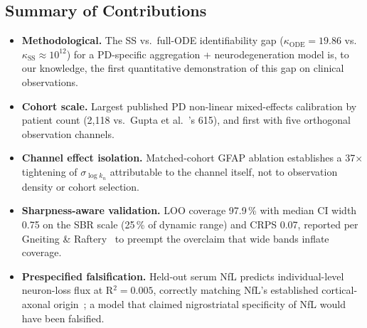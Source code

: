\subsection{Summary of Contributions}
\label{subsec:ch9-6-contributions}

\begin{itemize}
\item \textbf{Methodological.} The SS vs.\ full-ODE identifiability gap ($\kappa_\text{ODE} = 19.86$ vs.\ $\kappa_\text{SS} \approx 10^{12}$) for a PD-specific aggregation + neurodegeneration model is, to our knowledge, the first quantitative demonstration of this gap on clinical observations.
\item \textbf{Cohort scale.} Largest published PD non-linear mixed-effects calibration by patient count (2,118 vs.\ Gupta et al.~\cite{gupta2025}'s 615), and first with five orthogonal observation channels.
\item \textbf{Channel effect isolation.} Matched-cohort GFAP ablation establishes a 37$\times$ tightening of $\sigma_{\log k_n}$ attributable to the channel itself, not to observation density or cohort selection.
\item \textbf{Sharpness-aware validation.} LOO coverage 97.9\,\% with median CI width 0.75 on the SBR scale (25\,\% of dynamic range) and CRPS 0.07, reported per Gneiting \& Raftery~\cite{gneiting2007jasa} to preempt the overclaim that wide bands inflate coverage.
\item \textbf{Prespecified falsification.} Held-out serum NfL predicts individual-level neuron-loss flux at R$^2 = 0.005$, correctly matching NfL's established cortical-axonal origin~\cite{sampedro2020nfl,backstrom2020nfl,bartl2021ppmi}; a model that claimed nigrostriatal specificity of NfL would have been falsified.
\end{itemize}

\endinput
